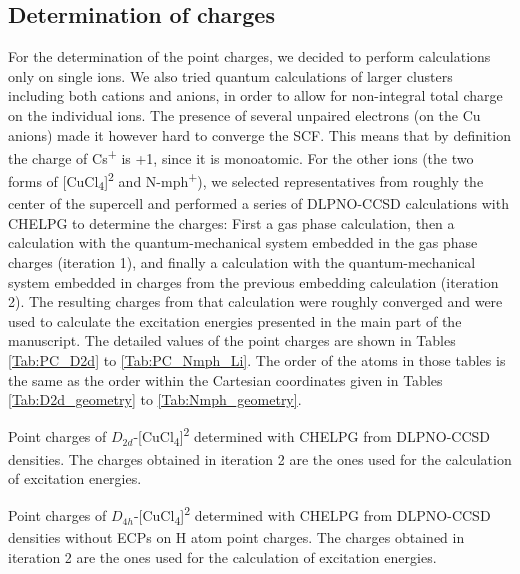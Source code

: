 \subsection{Determination of charges}
For the determination of the point charges, we decided to perform calculations only on single ions. We also tried quantum calculations of larger clusters including both cations and anions, in order to allow for non-integral total charge on the individual ions. The presence of several unpaired electrons (on the Cu anions) made it however hard to converge the SCF.
This means that by definition the charge of Cs\textsuperscript{+} is +1, since it is monoatomic. For the other ions (the two forms of [CuCl\textsubscript{4}]\textsuperscript{2\textminus} and N-mph\textsuperscript{+}), we selected representatives from roughly the center of the supercell and performed a series of DLPNO-CCSD calculations with CHELPG to determine the charges: First a gas phase calculation, then a calculation with the quantum-mechanical system embedded in the gas phase charges (iteration 1), and finally a calculation with the quantum-mechanical system embedded in charges from the previous embedding calculation (iteration 2). The resulting charges from that calculation were roughly converged and were used to calculate the excitation energies presented in the main part of the manuscript. The detailed values of the point charges are shown in Tables \ref{Tab:PC_D2d} to \ref{Tab:PC_Nmph_Li}. The order of the atoms in those tables is the same as the order within the Cartesian coordinates given in Tables \ref{Tab:D2d_geometry} to \ref{Tab:Nmph_geometry}.

\begin{table}
\small
\centering
\ttabbox
{\caption[Point charges of $D_{2d}$-{[CuCl\textsubscript{4}]\textsuperscript{2\textminus}}.]{Point charges of $D_{2d}$-[CuCl\textsubscript{4}]\textsuperscript{2\textminus} determined with CHELPG from DLPNO-CCSD densities. The charges obtained in iteration 2 are the ones used for the calculation of excitation energies.}
\label{Tab:PC_D2d}}
{
}
\end{table}

\begin{table}
\small
\centering
\ttabbox
{\caption[Point charges of $D_{4h}$-{[CuCl\textsubscript{4}]}\textsuperscript{2\textminus} obtained without ECPs on H atom point charges.]{Point charges of $D_{4h}$-[CuCl\textsubscript{4}]\textsuperscript{2\textminus} determined with CHELPG from DLPNO-CCSD densities without ECPs on H atom point charges. The charges obtained in iteration 2 are the ones used for the calculation of excitation energies.}
\label{Tab:PC_D4h_Hatom}}
{
}
\end{table}

